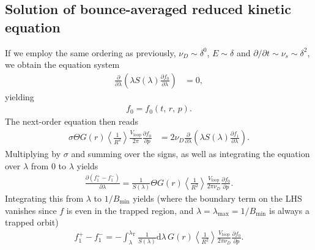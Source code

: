 \documentclass[11pt,a4paper]{article}
\newcommand{\rd}{\ensuremath{\mathrm{d}}}
\newcommand{\sub}[1]{\ensuremath{_{\text{#1}}}}
\begin{document}
\subsection{Solution of bounce-averaged reduced kinetic equation}
If we employ the same ordering as previously, $\nu_D \sim \delta^0$, $E\sim \delta$ and $\partial/\partial t \sim \nu_s \sim \delta^2$, we obtain the equation system
\begin{align}
\frac{\partial}{\partial \lambda} \left(\lambda S(\lambda)\frac{\partial f_0}{\partial \lambda}\right) &= 0,
\end{align}
yielding
\begin{align}
f_0 = f_0(t,\,r,\,p).
\end{align}
The next-order equation then reads
\begin{align}
\sigma  \Theta G(r) \left\langle\frac{1}{R^2}\right\rangle\frac{V\sub{loop}}{2\pi}\frac{\partial  f_0}{\partial p} &= 2\nu_D \frac{\partial}{\partial \lambda} \left(\lambda S(\lambda)\frac{\partial f_1}{\partial \lambda}\right) .
\end{align}
Multiplying by $\sigma$ and summing over the signs, as well as integrating the equation over $\lambda$ from 0 to $\lambda$ yields
\begin{align}
 \frac{\partial (f_1^+-f_1^-)}{\partial \lambda} = \frac{1}{S(\lambda)}\Theta G(r) \left\langle\frac{1}{R^2}\right\rangle\frac{V\sub{loop}}{2\pi\nu_D}\frac{\partial  f_0}{\partial p}.
\end{align}
Integrating this from $\lambda$ to $1/B\sub{min}$ yields (where the boundary term on the LHS vanishes since $f$ is even in the trapped region, and $\lambda=\lambda\sub{max}=1/B\sub{min}$ is always a trapped orbit)
\begin{align}
f_1^+-f_1^- = -\int_\lambda^{\lambda\sub{T}} \frac{1}{S(\lambda)}\rd \lambda \, G(r)\left\langle\frac{1}{R^2}\right\rangle\frac{V\sub{loop}}{2\pi\nu_D}\frac{\partial  f_0}{\partial p}.
\end{align}
\end{document}
